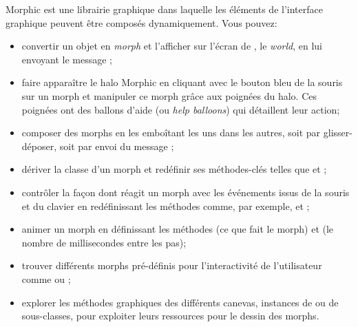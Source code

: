 \documentclass[a4paper,10pt,twoside]{book}
\begin{document}
Morphic est une librairie graphique dans laquelle les éléments de
l'interface graphique peuvent être composés dynamiquement.
Vous pouvez:
\begin{itemize}
  \item convertir un objet en \emph{morph} et l'afficher
    sur l'écran de \pharo, le \emph{world}, en lui envoyant le message
    ;
  \item faire apparaître le halo Morphic en cliquant avec le
    bouton bleu de la souris sur un morph et manipuler ce morph
    grâce aux poignées du halo. Ces poignées ont des ballons
    d'aide (ou \emph{help balloons}) qui détaillent leur action;
  \item composer des morphs en les emboîtant les uns dans les autres,
    soit par glisser-déposer, soit par envoi du message ;
  \item dériver la classe d'un morph et redéfinir ses
    méthodes-clés telles que  et ;
  \item contrôler la façon dont réagit un morph avec les
    événements issus de la souris et du clavier en redéfinissant les
    méthodes comme, par exemple,  et
    ;
  \item animer un morph en définissant les méthodes 
    (ce que fait le morph) et  (le nombre de
    millisecondes entre les pas);
  \item trouver différents morphs pré-définis pour
    l'interactivité de l'utilisateur comme
     ou ;
  \item explorer les méthodes graphiques des différents canevas,
    instances de  ou de sous-classes,
    pour exploiter leurs ressources pour le dessin des morphs.
\end{itemize}

\ifx\wholebook\relax\else
\end{document}
